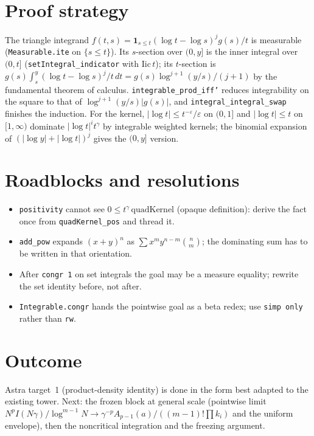 \documentclass[11pt]{article}
\begin{document}
\section{Proof strategy}
The triangle integrand $f(t,s)=\mathbf 1_{s\le t}(\log t-\log s)^jg(s)/t$ is measurable
(\texttt{Measurable.ite} on $\{s\le t\}$). Its $s$-section over $(0,y]$ is the inner integral over
$(0,t]$ (\texttt{setIntegral\_indicator} with $\mathrm{Iic}\,t$); its $t$-section is
$g(s)\int_s^y(\log t-\log s)^j/t\,dt=g(s)\log^{j+1}(y/s)/(j+1)$ by the fundamental theorem of calculus.
\texttt{integrable\_prod\_iff'} reduces integrability on the square to that of
$\log^{j+1}(y/s)|g(s)|$, and \texttt{integral\_integral\_swap} finishes the induction.
For the kernel, $|\log t|\le t^{-\varepsilon}/\varepsilon$ on $(0,1]$ and $|\log t|\le t$ on $[1,\infty)$
dominate $|\log t|^i t^\gamma$ by integrable weighted kernels; the binomial expansion of
$(|\log y|+|\log t|)^j$ gives the $(0,y]$ version.

\section{Roadblocks and resolutions}
\begin{itemize}
\item \texttt{positivity} cannot see $0\le t^\gamma\,\mathrm{quadKernel}$ (opaque definition): derive
the fact once from \texttt{quadKernel\_pos} and thread it.
\item \texttt{add\_pow} expands $(x+y)^n$ as $\sum x^m y^{n-m}\binom nm$; the dominating sum has to be
written in that orientation.
\item After \texttt{congr 1} on set integrals the goal may be a measure equality; rewrite the set
identity before, not after.
\item \texttt{Integrable.congr} hands the pointwise goal as a beta redex; use \texttt{simp only}
rather than \texttt{rw}.
\end{itemize}

\section{Outcome}
Astra target~1 (product-density identity) is done in the form best adapted to the existing tower.
Next: the frozen block at general scale (pointwise limit $N^pI(N\gamma)/\log^{m-1}N\to
\gamma^{-p}A_{p-1}(a)/((m-1)!\prod k_i)$ and the uniform envelope), then the noncritical
integration and the freezing argument.
\end{document}
